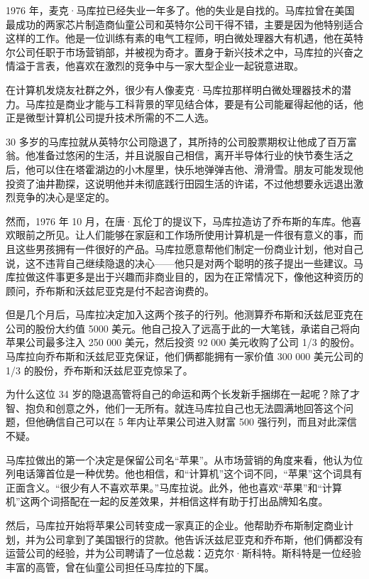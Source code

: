 \documentclass[12pt,UTF8]{ctexbook}
\begin{document}
1976 年，麦克·马库拉已经失业一年多了。他的失业是自找的。马库拉曾在美国最成功的两家芯片制造商仙童公司和英特尔公司干得不错，主要是因为他特别适合这样的工作。他是一位训练有素的电气工程师，明白微处理器大有机遇，他在英特尔公司任职于市场营销部，并被视为奇才。置身于新兴技术之中，马库拉的兴奋之情溢于言表，他喜欢在激烈的竞争中与一家大型企业一起锐意进取。

在计算机发烧友社群之外，很少有人像麦克·马库拉那样明白微处理器技术的潜力。马库拉是商业才能与工科背景的罕见结合体，要是有公司能雇得起他的话，他正是微型计算机公司提升技术所需的不二人选。

30 多岁的马库拉就从英特尔公司隐退了，其所持的公司股票期权让他成了百万富翁。他准备过悠闲的生活，并且说服自己相信，离开半导体行业的快节奏生活之后，他可以住在塔霍湖边的小木屋里，快乐地弹弹吉他、滑滑雪。朋友可能发现他投资了油井勘探，这说明他并未彻底践行田园生活的许诺，不过他想要永远退出激烈竞争的决心是坚定的。

然而，1976 年 10 月，在唐·瓦伦丁的提议下，马库拉造访了乔布斯的车库。他喜欢眼前之所见。让人们能够在家庭和工作场所使用计算机是一件很有意义的事，而且这些男孩拥有一件很好的产品。马库拉愿意帮他们制定一份商业计划，他对自己说，这不违背自己继续隐退的决心——他只是对两个聪明的孩子提出一些建议。马库拉做这件事更多是出于兴趣而非商业目的，因为在正常情况下，像他这种资历的顾问，乔布斯和沃兹尼亚克是付不起咨询费的。

但是几个月后，马库拉决定加入这两个孩子的行列。他测算乔布斯和沃兹尼亚克在公司的股份大约值 5000 美元。他自己投入了远高于此的一大笔钱，承诺自己将向苹果公司最多注入 250 000 美元，然后投资 92 000 美元收购了公司 1/3 的股份。马库拉向乔布斯和沃兹尼亚克保证，他们俩都能拥有一家价值 300 000 美元公司的 1/3 的股份，乔布斯和沃兹尼亚克惊呆了。

为什么这位 34 岁的隐退高管将自己的命运和两个长发新手捆绑在一起呢？除了才智、抱负和创意之外，他们一无所有。就连马库拉自己也无法圆满地回答这个问题，但他确信自己可以在 5 年内让苹果公司进入财富 500 强行列，而且对此深信不疑。

马库拉做出的第一个决定是保留公司名“苹果”。从市场营销的角度来看，他认为位列电话簿首位是一种优势。他也相信，和“计算机”这个词不同，“苹果”这个词具有正面含义。“很少有人不喜欢苹果。”马库拉说。此外，他也喜欢“苹果”和“计算机”这两个词搭配在一起的反差效果，并相信这样有助于打出品牌知名度。

然后，马库拉开始将苹果公司转变成一家真正的企业。他帮助乔布斯制定商业计划，并为公司拿到了美国银行的贷款。他告诉沃兹尼亚克和乔布斯，他们俩都没有运营公司的经验，并为公司聘请了一位总裁：迈克尔·斯科特。斯科特是一位经验丰富的高管，曾在仙童公司担任马库拉的下属。
\end{document}
